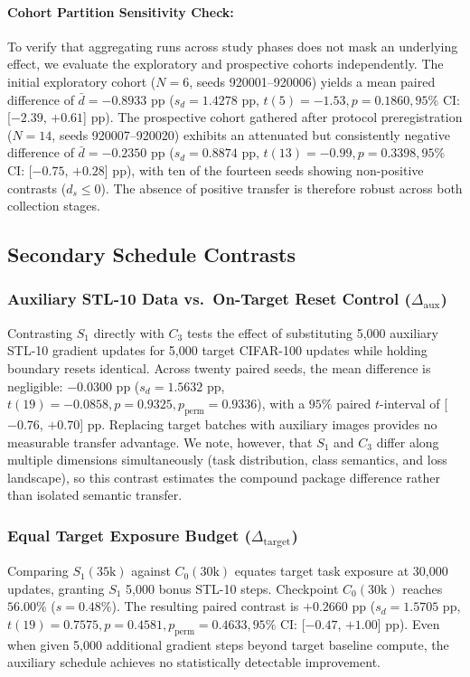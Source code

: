 \documentclass[sn-mathphys,Numbered]{sn-jnl}
\begin{document}
\paragraph{Cohort Partition Sensitivity Check:}
To verify that aggregating runs across study phases does not mask an underlying effect, we evaluate the exploratory and prospective cohorts independently. The initial exploratory cohort ($N = 6$, seeds 920001--920006) yields a mean paired difference of $\bar{d} = -0.8933$ pp ($s_d = 1.4278$ pp, $t(5) = -1.53, p = 0.1860, 95\%$ CI: [$-2.39$, $+0.61$] pp). The prospective cohort gathered after protocol preregistration ($N = 14$, seeds 920007--920020) exhibits an attenuated but consistently negative difference of $\bar{d} = -0.2350$ pp ($s_d = 0.8874$ pp, $t(13) = -0.99, p = 0.3398, 95\%$ CI: [$-0.75$, $+0.28$] pp), with ten of the fourteen seeds showing non-positive contrasts ($d_s \le 0$). The absence of positive transfer is therefore robust across both collection stages.

\subsection{Secondary Schedule Contrasts}\label{subsec:results_secondary}

\subsubsection{Auxiliary STL-10 Data vs.\ On-Target Reset Control (\texorpdfstring{$\Delta_{\mathrm{aux}}$}{Delta-aux})}
Contrasting $S_1$ directly with $C_3$ tests the effect of substituting 5,000 auxiliary STL-10 gradient updates for 5,000 target CIFAR-100 updates while holding boundary resets identical. Across twenty paired seeds, the mean difference is negligible: $-0.0300$ pp ($s_d = 1.5632$ pp, $t(19) = -0.0858, p = 0.9325, p_{\mathrm{perm}} = 0.9336$), with a $95\%$ paired $t$-interval of [$-0.76$, $+0.70$] pp. Replacing target batches with auxiliary images provides no measurable transfer advantage. We note, however, that $S_1$ and $C_3$ differ along multiple dimensions simultaneously (task distribution, class semantics, and loss landscape), so this contrast estimates the compound package difference rather than isolated semantic transfer.

\subsubsection{Equal Target Exposure Budget (\texorpdfstring{$\Delta_{\mathrm{target}}$}{Delta-target})}
Comparing $S_1(35\mathrm{k})$ against $C_0(30\mathrm{k})$ equates target task exposure at 30,000 updates, granting $S_1$ 5,000 bonus STL-10 steps. Checkpoint $C_0(30\mathrm{k})$ reaches $56.00\%$ ($s = 0.48\%$). The resulting paired contrast is $+0.2660$ pp ($s_d = 1.5705$ pp, $t(19) = 0.7575, p = 0.4581, p_{\mathrm{perm}} = 0.4633, 95\%$ CI: [$-0.47$, $+1.00$] pp). Even when given 5,000 additional gradient steps beyond target baseline compute, the auxiliary schedule achieves no statistically detectable improvement.
\end{document}
